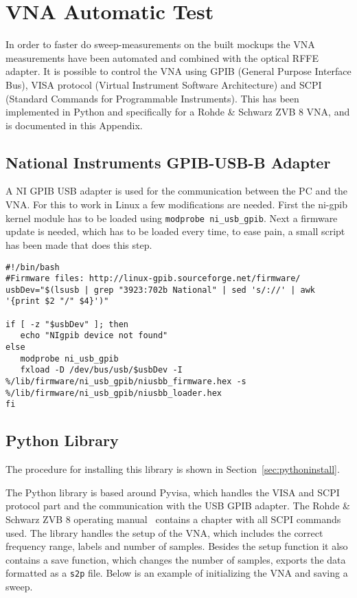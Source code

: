 \section{VNA Automatic Test}
\label{sec:vna_python}
In order to faster do sweep-measurements on the built mockups the VNA measurements have been automated and combined with the optical RFFE adapter. It is possible to control the VNA using GPIB (General Purpose Interface Bus), VISA protocol (Virtual Instrument Software Architecture) and SCPI (Standard Commands for Programmable Instruments). This has been implemented in Python and specifically for a Rohde \& Schwarz ZVB 8 VNA, and is documented in this Appendix. 

\subsection{National Instruments GPIB-USB-B Adapter}
A NI GPIB USB adapter is used for the communication between the PC and the VNA. For this to work in Linux a few modifications are needed. First the ni-gpib kernel module has to be loaded using \verb|modprobe ni_usb_gpib|. Next a firmware update is needed, which has to be loaded every time, to ease pain, a small script has been made that does this step. 

\begin{lstlisting}
#!/bin/bash
#Firmware files: http://linux-gpib.sourceforge.net/firmware/
usbDev="$(lsusb | grep "3923:702b National" | sed 's/://' | awk '{print $2 "/" $4}')"

if [ -z "$usbDev" ]; then
   echo "NIgpib device not found"
else
   modprobe ni_usb_gpib
   fxload -D /dev/bus/usb/$usbDev -I %/lib/firmware/ni_usb_gpib/niusbb_firmware.hex -s %/lib/firmware/ni_usb_gpib/niusbb_loader.hex    
fi
\end{lstlisting}

\subsection{Python Library}
The procedure for installing this library is shown in Section~\ref{sec:pythoninstall}.

The Python library is based around Pyvisa, which handles the VISA and SCPI protocol part and the communication with the USB GPIB adapter. The Rohde \& Schwarz ZVB 8 operating manual~\cite{RhodeSmanual} contains a chapter with all SCPI commands used. The library handles the setup of the VNA, which includes the correct frequency range, labels and number of samples. Besides the setup function it also contains a save function, which changes the number of samples, exports the data formatted as a \verb|s2p| file. Below is an example of initializing the VNA and saving a sweep. 

